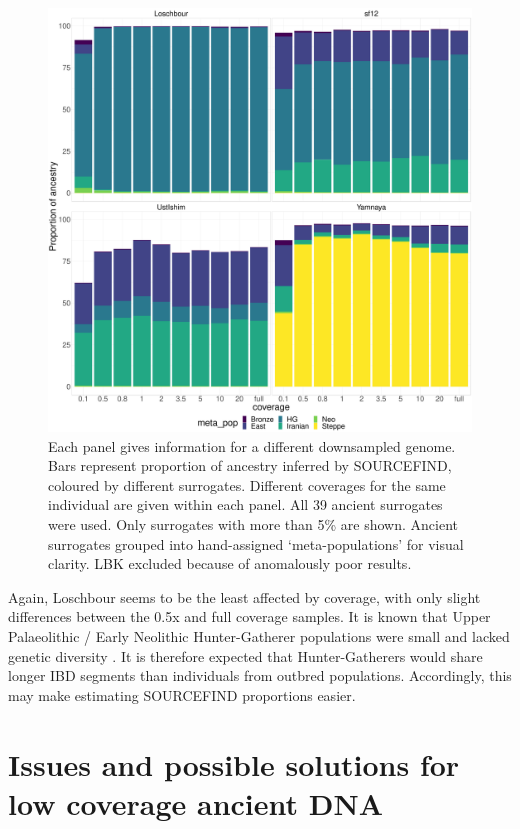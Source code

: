 \begin{figure}[htp]
    \centering
    \includegraphics[width=1.0\textwidth]{../images/chapter1/Allpops_SF_downsampled.pdf}
    \caption{Each panel gives information for a different downsampled genome. Bars represent proportion of ancestry inferred by SOURCEFIND, coloured by different surrogates. Different coverages for the same individual are given within each panel. All 39 ancient surrogates were used. Only surrogates with more than 5\% are shown. Ancient surrogates grouped into hand-assigned `meta-populations' for visual clarity. LBK excluded because of anomalously poor results.}
    \label{fig:SOURCEFIND_AllPSop_downsampled}
\end{figure}

Again, Loschbour seems to be the least affected by coverage, with only slight differences between the 0.5x and full coverage samples. It is known that Upper Palaeolithic / Early Neolithic Hunter-Gatherer populations were small and lacked genetic diversity \cite{excoffier1999hunter, Lazaridis2014, Fu2016}. It is therefore expected that Hunter-Gatherers would share longer IBD segments than individuals from outbred populations. Accordingly, this may make estimating SOURCEFIND proportions easier.


\section{Issues and possible solutions for low coverage ancient DNA}

